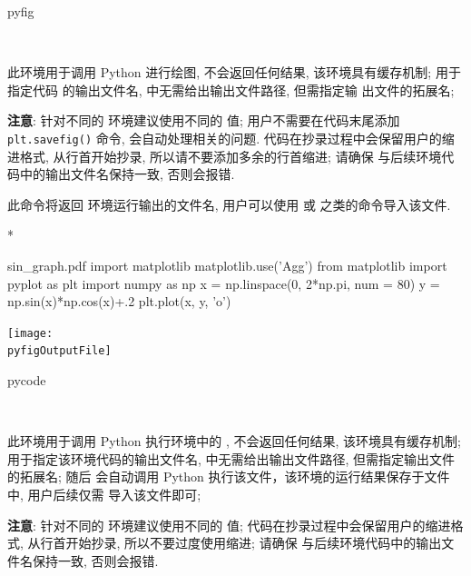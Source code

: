 \documentclass[
  hyper, lang=cn, 
  class=l3dox, 
]{../../zlatex/code/ztex}
\begin{document}
\begin{function}[updated=2025-05-21]{pyfig}
  \begin{syntax}
    ~~~~ 
  \end{syntax}
  此环境用于调用 Python 进行绘图, 不会返回任何结果, 该环境具有缓存机制;
   用于指定代码  的输出文件名,  中无需给出输出文件路径, 但需指定输
  出文件的拓展名;\par 
  \textbf{注意}: 针对不同的  环境建议使用不同的  值; 用户不需要在代码末尾添加 \verb|plt.savefig()| 命令,
  \ztikz{} 会自动处理相关的问题. 代码在抄录过程中会保留用户的缩进格式, 从行首开始抄录, 所以请不要添加多余的行首缩进;
  请确保  与后续环境代码中的输出文件名保持一致, 否则会报错.
\end{function}


\begin{function}[added=2025-04-21]{\pyfigOutputFile}
  此命令将返回  环境运行输出的文件名, 用户可以使用  
  或  之类的命令导入该文件.
\end{function}

\begin{DocExample}*
\begin{pyfig}{sin_graph.pdf}
import matplotlib
matplotlib.use('Agg')
from matplotlib import pyplot as plt
import numpy as np
x = np.linspace(0, 2*np.pi, num = 80)
y = np.sin(x)*np.cos(x)+.2
plt.plot(x, y, 'o')
\end{pyfig}
\begin{center}
  \texttt{[image: \\pyfigOutputFile]}
\end{center}
\end{DocExample}


\begin{function}[added=2025-05-21]{pycode}
  \begin{syntax}
  ~~~~ 
  \end{syntax}
  此环境用于调用 Python 执行环境中的 , 不会返回任何结果, 该环境具有缓存机制; 
   用于指定该环境代码的输出文件名,  中无需给出输出文件路径, 但需指定输出文件的拓展名; 
  随后 \ztikz{} 会自动调用 Python 执行该文件，该环境的运行结果保存于文件  中, 用户后续仅需
  导入该文件即可;\par 
  \textbf{注意}: 针对不同的  环境建议使用不同的  值; 代码在抄录过程中会保留用户的缩进格式, 
  从行首开始抄录, 所以不要过度使用缩进; 请确保  与后续环境代码中的输出文件名保持一致, 否则会报错.
\end{function}
\end{document}
